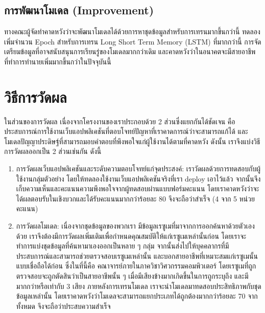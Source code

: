 \subsection{การพัฒนาโมเดล (Improvement)}
ทางคณะผู้จัดทำคาดหวังว่าจะพัฒนาโมเดลได้ด้วยการหาชุดข้อมูลสำหรับการเทรนมากขึ้นกว่านี้ ทดลองเพิ่มจำนวน Epoch สำหรับการเทรน
Long Short Term Memory (LSTM) ที่มากกว่านี้ การจัดเตรียมข้อมูลที่อาจสนับสนุนการเรียนรู่ของโมเดลมากกว่าเดิม และคาดหวังว่าในอนาคตจะมีสายอาชีพที่ทำการทำนายเพิ่มมากขึ้นกว่าในปัจจุบันนี้


\section{วิธีการวัดผล}
ในส่วนของการวัดผล เนื่องจากโครงงานของเราประกอบด้วย 2 ส่วนซึ่งแยกกันได้ชัดเจน คือ ประสบการณ์การใช้งานเว็บแอปพลิเคชันที่ตอบโจทย์ปัญหาที่เราคาดการณ์ว่าจะสามารถแก้ได้
และโมเดลปัญญาประดิษฐ์ที่สามารถมอบคำตอบที่พึงพอใจแก่ผู้ใช้งานได้ตามที่คาดหวัง ดังนั้น เราจึงแบ่งวิธีการวัดผลออกเป็น 2 ส่วนเช่นกัน ดังนี้

\begin{enumerate}
    \item การวัดผลเว็บแอปพลิเคชันและระดับความตอบโจทย์แก่จุดประสงค์: เราวัดผลด้วยการทดสอบกับผู้ใช้งานกลุ่มตัวอย่าง โดยให้ทดลองใช้งานเว็บแอปพลิเคชันจริงที่เรา deploy เอาไว้แล้ว จากนั้นจึงเก็บความเห็นและคะแนนความพึงพอใจจากผู้ทดสอบผ่านแบบฟอร์มคะแนน
          โดยเราคาดหวังว่าจะได้ผลตอบรับในเชิงบวกและได้รับคะแนนมากกว่าร้อยละ 80 จึงจะถือว่าสำเร็จ (4 จาก 5 หน่วยคะแนน)
    \item การวัดผลโมเดล: เนื่องจากชุดข้อมูลของพวกเรา มีข้อมูลเรซูเมที่มาจากการออกค้นหาด้วยตัวเองด้วย เราจึงต้องมีการวัดผลเพิ่มเติมเพื่อกำหนดคุณสมบัติให้แก่เรซูเมเหล่านั้นก่อน
          โดยเราจะทำการแบ่งชุดข้อมูลที่ค้นหามาเองออกเป็นหลาย ๆ กลุ่ม จากนั้นส่งไปให้บุคคลากรที่มีประสบการณ์และสามารถช่วยตรวจสอบเรซูเมเหล่านั้น
          และบอกสายอาชีพที่เหมาะสมแก่เรซูเมนั้นแบบเชื่อถือได้ก่อน ซึ่งในที่นี้คือ คณาจารย์ภายในภาควิชาวิศวกรรมคอมพิวเตอร์
          โดยเรซูเมที่ถูกตรวจสอบจะถูกตัดสินว่าเป็นสายอาชีพนั้น ๆ เมื่อมีเสียงข้างมากเกิดขึ้นในการถูกระบุถึง และมีมากกว่าหรือเท่ากับ 3 เสียง
          ภายหลังการเทรนโมเดล เราจะนำโมเดลมาทดสอบประสิทธิภาพกับชุดข้อมูลเหล่านั้น โดยเราคาดหวังว่าโมเดลจะสามารถแยกประเภทได้ถูกต้องมากกว่าร้อยละ 70 จากทั้งหมด จึงจะถือว่าประสบความสำเร็จ
\end{enumerate}

